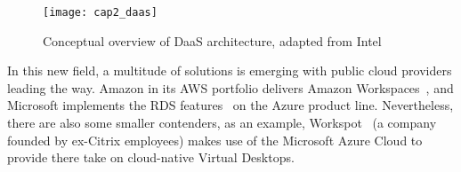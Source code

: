 \begin{description}
		\begin{figure}[htbp]
			\centering
			\texttt{[image: cap2\_daas]}
			\caption[Conceptual overview of DaaS architecture, adapted from Intel]{Conceptual overview of DaaS architecture, adapted from Intel~\cite{Jain2014}}
			\label{fig:daas}
		\end{figure}

		In this new field, a multitude of solutions is emerging with public cloud providers leading the way. Amazon in its AWS portfolio delivers Amazon Workspaces~\cite{aws_workspaces}, and Microsoft implements the RDS features~\cite{azure_rds} on the Azure product line. Nevertheless, there are also some smaller contenders, as an example, Workspot~\cite{workspot} (a company founded by ex-Citrix employees) makes use of the Microsoft Azure Cloud to provide there take on cloud-native Virtual Desktops.
\end{description}



